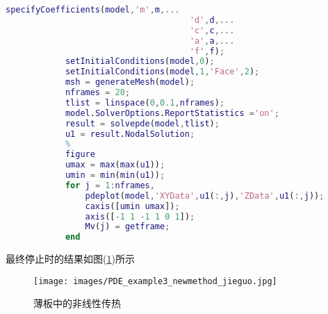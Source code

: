 \begin{lstlisting}[language = Matlab]
            specifyCoefficients(model,'m',m,...
                                     'd',d,...
                                     'c',c,...
                                     'a',a,...
                                     'f',f);
            setInitialConditions(model,0);
            setInitialConditions(model,1,'Face',2);
            msh = generateMesh(model);
            nframes = 20;
            tlist = linspace(0,0.1,nframes);
            model.SolverOptions.ReportStatistics ='on';
            result = solvepde(model,tlist);
            u1 = result.NodalSolution;
            %
            figure
            umax = max(max(u1));
            umin = min(min(u1));
            for j = 1:nframes,
                pdeplot(model,'XYData',u1(:,j),'ZData',u1(:,j));
                caxis([umin umax]);
                axis([-1 1 -1 1 0 1]);
                Mv(j) = getframe;
            end
            \end{lstlisting}
            最终停止时的结果如图(\ref{薄板中的非线性传热})所示
            \begin{figure}[H]
            \centering
            \texttt{[image: images/PDE\_example3\_newmethod\_jieguo.jpg]}
            \caption{薄板中的非线性传热}
            \label{薄板中的非线性传热}
            \end{figure}




